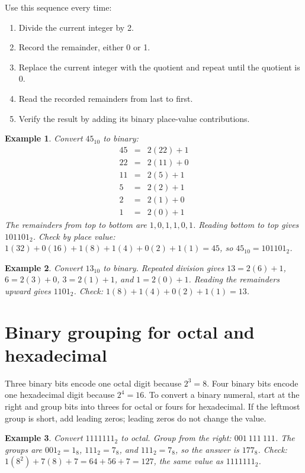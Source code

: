 \documentclass[11pt]{article}
\newtheorem{example}{Example}[section]
\begin{document}
Use this sequence every time:
\begin{enumerate}
  \item Divide the current integer by 2.
  \item Record the remainder, either 0 or 1.
  \item Replace the current integer with the quotient and repeat until the
    quotient is 0.
  \item Read the recorded remainders from last to first.
  \item Verify the result by adding its binary place-value contributions.
\end{enumerate}

\begin{example}
Convert $45_{10}$ to binary:
\[
\begin{array}{rcl}
45&=&2(22)+1\\
22&=&2(11)+0\\
11&=&2(5)+1\\
5&=&2(2)+1\\
2&=&2(1)+0\\
1&=&2(0)+1
\end{array}
\]
The remainders from top to bottom are $1,0,1,1,0,1$. Reading bottom to top
gives $101101_2$. Check by place value:
$1(32)+0(16)+1(8)+1(4)+0(2)+1(1)=45$, so
$45_{10}=101101_2$.
\end{example}

\begin{example}
Convert $13_{10}$ to binary. Repeated division gives
$13=2(6)+1$, $6=2(3)+0$, $3=2(1)+1$, and $1=2(0)+1$. Reading the
remainders upward gives $1101_2$. Check:
$1(8)+1(4)+0(2)+1(1)=13$.
\end{example}

\section{Binary grouping for octal and hexadecimal}
Three binary bits encode one octal digit because $2^3=8$. Four binary bits
encode one hexadecimal digit because $2^4=16$. To convert a binary numeral,
start at the right and group bits into threes for octal or fours for
hexadecimal. If the leftmost group is short, add leading zeros; leading
zeros do not change the value.

\begin{example}
Convert $1111111_2$ to octal. Group from the right:
$001\ 111\ 111$. The groups are $001_2=1_8$, $111_2=7_8$, and
$111_2=7_8$, so the answer is $177_8$. Check:
$1(8^2)+7(8)+7=64+56+7=127$, the same value as $1111111_2$.
\end{example}
\end{document}
